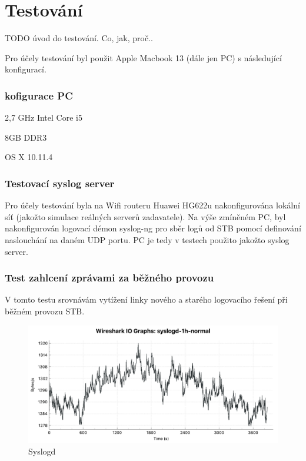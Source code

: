 \documentclass[thesis=B,czech]{FITthesis}[2012/06/26]
\begin{document}
\chapter{Testování}
TODO úvod do testování. Co, jak, proč..

Pro účely testování byl použit Apple Macbook 13 (dále jen PC) s následující konfigurací.
\subsection*{kofigurace PC}
\begin{description}
\setlength\itemsep{-1ex}
  \item [CPU:] 2,7 GHz Intel Core i5
  \item [RAM:] 8GB DDR3
  \item [OS:] OS X 10.11.4
\end{description}

\subsection*{Testovací syslog server}
Pro účely testování byla na Wifi routeru Huawei HG622u nakonfigurována lokální síť (jakožto simulace reálných serverů zadavatele). Na výše zmíněném PC, byl nakonfigurován logovací démon syslog-ng pro sběr logů od STB pomocí definování naslouchání na daném UDP portu. PC je tedy v testech použito jakožto syslog server.

\subsection{Test zahlcení zprávami za běžného provozu}
 V tomto testu srovnávám vytížení linky nového a starého logovacího řešení při běžném provozu STB. 

\begin{figure}[H]
	\centering
	\includegraphics[scale=0.44]{images/test-1h-syslogd-default}
	\caption[Syslogd]{Syslogd}
\end{figure}
\end{document}
